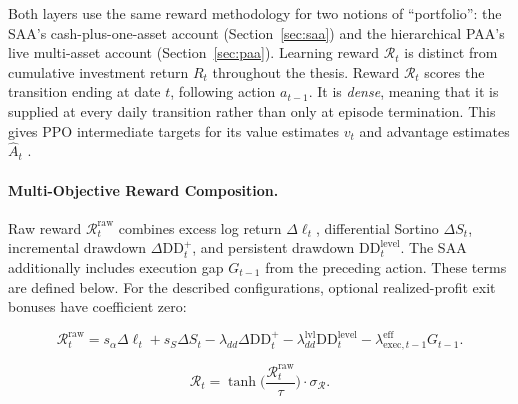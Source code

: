 Both layers use the same reward methodology for two notions of ``portfolio'': the SAA's cash-plus-one-asset account (Section~\ref{sec:saa}) and the hierarchical PAA's live multi-asset account (Section~\ref{sec:paa}). Learning reward \(\mathcal R_t\) is distinct from cumulative investment return \(R_t\) throughout the thesis. Reward \(\mathcal R_t\) scores the transition ending at date \(t\), following action \(a_{t-1}\). It is \emph{dense}, meaning that it is supplied at every daily transition rather than only at episode termination. This gives PPO intermediate targets for its value estimates \(v_t\) and advantage estimates \(\hat A_t\) \cite{SuttonBarto,JohnSchulmanFilipWolskiPrafullaDhariwalAlecRadfordOlegKlimov.2017}.

\paragraph{Multi-Objective Reward Composition.}

Raw reward \(\mathcal R_t^{\mathrm{raw}}\) combines excess log return \(\Delta\ell_t\), differential Sortino \(\Delta S_t\), incremental drawdown \(\Delta\mathrm{DD}_t^+\), and persistent drawdown \(\mathrm{DD}_t^{\mathrm{level}}\). The SAA additionally includes execution gap \(G_{t-1}\) from the preceding action. These terms are defined below. For the described configurations, optional realized-profit exit bonuses have coefficient zero:

\begin{equation}
\mathcal R_t^{\mathrm{raw}}=s_\alpha\Delta\ell_t+s_S\Delta S_t
-\lambda_{dd}\Delta\mathrm{DD}_t^+
-\lambda_{dd}^{\mathrm{lvl}}\mathrm{DD}_t^{\mathrm{level}}
-\lambda_{\mathrm{exec},t-1}^{\mathrm{eff}}G_{t-1}.
\label{eq:reward-composition}
\end{equation}

\begin{equation}
\mathcal R_t = \tanh\!\Big(\frac{\mathcal R_t^{\mathrm{raw}}}{\tau}\Big) \cdot \sigma_{\mathcal R}.
\label{eq:reward-squash}
\end{equation}

